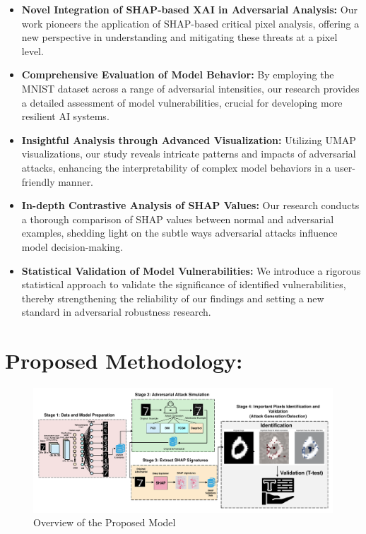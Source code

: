 \documentclass[10pt, conference, a4paper, final]{IEEEtran}
\begin{document}
\begin{itemize}
    \item \textbf{Novel Integration of SHAP-based XAI in Adversarial Analysis:} Our work pioneers the application of SHAP-based critical pixel analysis, offering a new perspective in understanding and mitigating these threats at a pixel level.
    
    \item \textbf{Comprehensive Evaluation of Model Behavior:} By employing the MNIST dataset across a range of adversarial intensities, our research provides a detailed assessment of model vulnerabilities, crucial for developing more resilient AI systems.
    
    \item \textbf{Insightful Analysis through Advanced Visualization:} Utilizing UMAP visualizations, our study reveals intricate patterns and impacts of adversarial attacks, enhancing the interpretability of complex model behaviors in a user-friendly manner.
    
    \item \textbf{In-depth Contrastive Analysis of SHAP Values:} Our research conducts a thorough comparison of SHAP values between normal and adversarial examples, shedding light on the subtle ways adversarial attacks influence model decision-making.
    
    \item \textbf{Statistical Validation of Model Vulnerabilities:} We introduce a rigorous statistical approach to validate the significance of identified vulnerabilities, thereby strengthening the reliability of our findings and setting a new standard in adversarial robustness research.

\end{itemize}


\section{Proposed Methodology:}

\begin{figure}[!ht]
    \centering
    \includegraphics[width=1\textwidth]{paper_images/papermodel_v2.pdf}
    \caption{Overview of the Proposed Model}
    \label{overview}
\end{figure}
   
\end{document}
